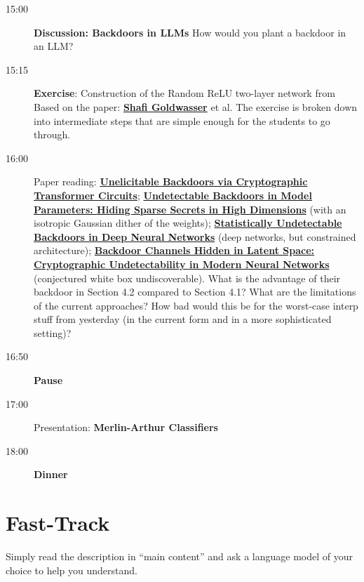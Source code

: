 \documentclass[11pt]{article}
\begin{document}
\begin{description}
  \item[15:00] \textbf{Discussion: Backdoors in LLMs} How would you plant a
    backdoor in an LLM?

  \item[15:15] \textbf{Exercise}: Construction of the Random ReLU two-layer
    network from Based on the paper:
    \href{https://arxiv.org/pdf/2204.06974}{\textbf{Shafi Goldwasser}} et al.
    The exercise is broken down into intermediate steps that are simple enough
    for the students to go through.

  \item[16:00] Paper reading:
    \href{https://arxiv.org/html/2406.02619v1}{\textbf{Unelicitable Backdoors
    via Cryptographic Transformer Circuits}};
    \href{https://arxiv.org/html/2605.04209v2}{\textbf{Undetectable Backdoors
    in Model Parameters: Hiding Sparse Secrets in High Dimensions}} (with an
    isotropic Gaussian dither of the weights);
    \href{https://arxiv.org/html/2607.09532v1}{\textbf{Statistically
    Undetectable Backdoors in Deep Neural Networks}} (deep networks, but
    constrained architecture);
    \href{https://arxiv.org/html/2605.13214}{\textbf{Backdoor Channels Hidden
    in Latent Space: Cryptographic Undetectability in Modern Neural Networks}}
    (conjectured white box undiscoverable).
    What is the advantage of their backdoor in Section 4.2 compared to Section
    4.1? What are the limitations of the current approaches? How bad would this
    be for the worst-case interp stuff from yesterday (in the current form and
    in a more sophisticated setting)?

  \item[16:50] \textbf{Pause}

  \item[17:00] Presentation: \textbf{Merlin-Arthur Classifiers}

  \item[18:00] \textbf{Dinner}
\end{description}

\section{Fast-Track}
\label{sec:fast-track}

Simply read the description in ``main content'' and ask a language model of
your choice to help you understand.

\end{document}
